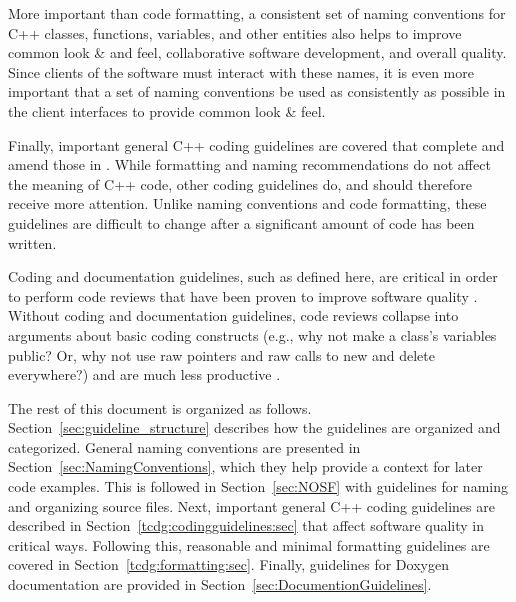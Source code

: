 More important than code formatting, a consistent set of naming
conventions for C++ classes, functions, variables, and other entities
also helps to improve common look \& and feel, collaborative software
development, and overall quality.  Since clients of the software must
interact with these names, it is even more important that a set of
naming conventions be used as consistently as possible in the client
interfaces to provide common look \& feel.

Finally, important general C++ coding guidelines are covered that
complete and amend those in {}\cite{C++CodingStandards05}.  While
formatting and naming recommendations do not affect the meaning of C++
code, other coding guidelines do, and should therefore receive more
attention.  Unlike naming conventions and code formatting, these
guidelines are difficult to change after a significant amount of code
has been written.

Coding and documentation guidelines, such as defined here, are
critical in order to perform code reviews that have been proven to
improve software quality {}\cite{CodeComplete2nd04}.  Without coding
and documentation guidelines, code reviews collapse into arguments
about basic coding constructs (e.g., why not make a class's variables
public?  Or, why not use raw pointers and raw calls to new and delete
everywhere?) and are much less productive
{}\cite{ImplementingLeanSoftwareDevelopment}.

The rest of this document is organized as follows.
Section~\ref{sec:guideline_structure} describes how the guidelines are
organized and categorized.  General naming conventions are presented
in Section~\ref{sec:NamingConventions}, which they help provide a
context for later code examples.  This is followed in
Section~\ref{sec:NOSF} with guidelines for naming and organizing
source files.  Next, important general C++ coding guidelines are
described in Section~\ref{tcdg:codingguidelines:sec} that affect
software quality in critical ways.  Following this, reasonable and
minimal formatting guidelines are covered in
Section~\ref{tcdg:formatting:sec}.  Finally, guidelines for Doxygen
documentation are provided in Section~\ref{sec:DocumentionGuidelines}.

